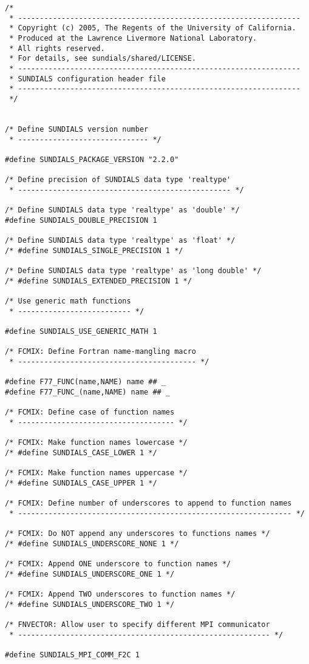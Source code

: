 \newpage
\begin{lstlisting}
/*
 * -----------------------------------------------------------------
 * Copyright (c) 2005, The Regents of the University of California.
 * Produced at the Lawrence Livermore National Laboratory.
 * All rights reserved.
 * For details, see sundials/shared/LICENSE.
 * -----------------------------------------------------------------
 * SUNDIALS configuration header file
 * -----------------------------------------------------------------
 */
 

/* Define SUNDIALS version number
 * ------------------------------ */

#define SUNDIALS_PACKAGE_VERSION "2.2.0"
 
/* Define precision of SUNDIALS data type 'realtype'
 * ------------------------------------------------- */

/* Define SUNDIALS data type 'realtype' as 'double' */
#define SUNDIALS_DOUBLE_PRECISION 1

/* Define SUNDIALS data type 'realtype' as 'float' */
/* #define SUNDIALS_SINGLE_PRECISION 1 */

/* Define SUNDIALS data type 'realtype' as 'long double' */
/* #define SUNDIALS_EXTENDED_PRECISION 1 */

/* Use generic math functions
 * -------------------------- */

#define SUNDIALS_USE_GENERIC_MATH 1
  
/* FCMIX: Define Fortran name-mangling macro
 * ----------------------------------------- */

#define F77_FUNC(name,NAME) name ## _
#define F77_FUNC_(name,NAME) name ## _

/* FCMIX: Define case of function names
 * ------------------------------------ */
 
/* FCMIX: Make function names lowercase */
/* #define SUNDIALS_CASE_LOWER 1 */

/* FCMIX: Make function names uppercase */
/* #define SUNDIALS_CASE_UPPER 1 */

/* FCMIX: Define number of underscores to append to function names
 * --------------------------------------------------------------- */

/* FCMIX: Do NOT append any underscores to functions names */
/* #define SUNDIALS_UNDERSCORE_NONE 1 */

/* FCMIX: Append ONE underscore to function names */
/* #define SUNDIALS_UNDERSCORE_ONE 1 */

/* FCMIX: Append TWO underscores to function names */
/* #define SUNDIALS_UNDERSCORE_TWO 1 */
 
/* FNVECTOR: Allow user to specify different MPI communicator
 * ---------------------------------------------------------- */

#define SUNDIALS_MPI_COMM_F2C 1

\end{lstlisting}
